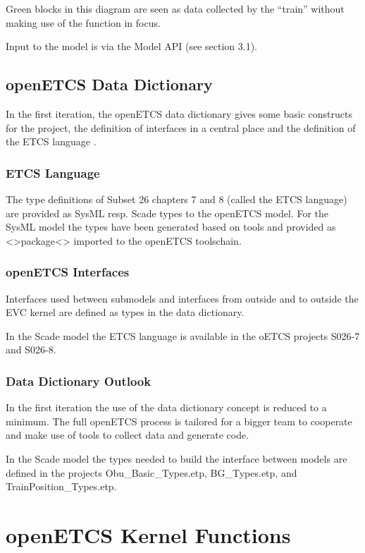 \documentclass{template/openetcs_report}
\begin{document}
Green blocks in this diagram are seen as data collected by the ``train'' without making use of the function in focus.

Input to the model is via the Model API (see section 3.1).  

\section{openETCS Data Dictionary}
In the first iteration, the openETCS data dictionary gives some basic constructs for the project, the definition of interfaces in a central place and the definition of the ETCS language \cite{dataDictionary}.

\subsection{ETCS Language}
The type definitions of Subset 26 chapters 7 and 8 (called the ETCS language) are provided as SysML resp. Scade types to the openETCS model. For the SysML model the types have been generated based on tools and provided as <>package<> imported to the openETCS toolschain.



\subsection{openETCS Interfaces}
Interfaces used between submodels and interfaces from outside and to outside the EVC kernel are defined as types in the data dictionary.

In the Scade model the ETCS language is available in the oETCS projects S026-7 and S026-8.

\subsection{Data Dictionary Outlook}
In the first iteration the use of the data dictionary concept is reduced to a minimum. The full openETCS process is tailored for a bigger team to cooperate and make use of tools to collect data and generate code. 

In the Scade model the types needed to build the interface between models are defined in the projects Obu\_Basic\_Types.etp, BG\_Types.etp, and TrainPosition\_Types.etp.


\chapter{openETCS Kernel Functions}
\end{document}
